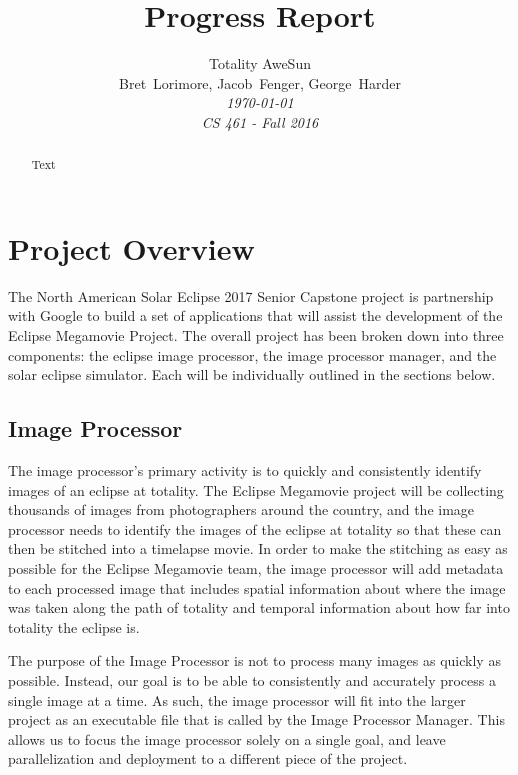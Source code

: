 \documentclass[10pt, onecolumn, draftclsnofoot, letterpaper, compsoc]{IEEEtran}
\title{Progress Report}
\author{Totality AweSun \\
		Bret~Lorimore, Jacob~Fenger, George~Harder \\
		\textit{\today \\
		CS 461 - Fall 2016}}
\begin{document}
\maketitle

\begin{abstract}

Text

\end{abstract}

\newpage

\tableofcontents

\newpage

\section{Project Overview}

The North American Solar Eclipse 2017 Senior Capstone project is partnership
with Google to build a set of applications that will assist the development of
the Eclipse Megamovie Project. The overall project has been broken down into
three components: the eclipse image processor, the image processor manager, and
the solar eclipse simulator. Each will be individually outlined in the sections
below.

\subsection{Image Processor}

The image processor’s primary activity is to quickly and consistently identify
images of an eclipse at totality. The Eclipse Megamovie project will be
collecting thousands of images from photographers around the country, and the
image processor needs to identify the images of the eclipse at totality so that
these can then be stitched into a timelapse movie. In order to make the
stitching as easy as possible for the Eclipse Megamovie team, the image
processor will add metadata to each processed image that includes spatial
information about where the image was taken along the path of totality and
temporal information about how far into totality the eclipse is.


The purpose of the Image Processor is not to process many images as quickly as
possible. Instead, our goal is to be able to consistently and accurately process
a single image at a time. As such, the image processor will fit into the larger
project as an executable file that is called by the Image Processor Manager.
This allows us to focus the image processor solely on a single goal, and leave
parallelization and deployment to a different piece of the project.
\end{document}
